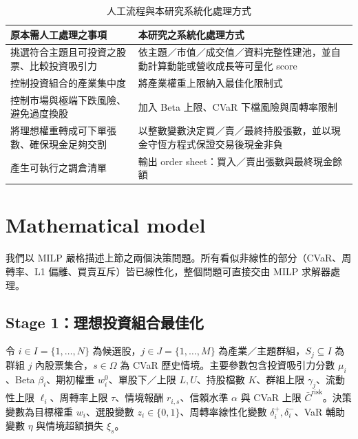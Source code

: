 \documentclass[11pt,a4paper]{article}
\begin{document}
\begin{table}[!hbt]
\centering
\small
\begin{tabular}{p{} p{}}
\toprule
原本需人工處理之事項 & 本研究之系統化處理方式 \\
\midrule
挑選符合主題且可投資之股票、比較投資吸引力 & 依主題／市值／成交值／資料完整性建池，並自動計算動能或營收成長等可量化 score \\
控制投資組合的產業集中度 & 將產業權重上限納入最佳化限制式 \\
控制市場與極端下跌風險、避免過度換股 & 加入 Beta 上限、CVaR 下檔風險與周轉率限制 \\
將理想權重轉成可下單張數、確保現金足夠交割 & 以整數變數決定買／賣／最終持股張數，並以現金守恆方程式保證交易後現金非負 \\
產生可執行之調倉清單 & 輸出 order sheet：買入／賣出張數與最終現金餘額 \\
\bottomrule
\end{tabular}
\caption{人工流程與本研究系統化處理方式}
\label{tab:auto}
\end{table}



\section{Mathematical model}
\label{sec-model}

我們以 MILP 嚴格描述上節之兩個決策問題。所有看似非線性的部分（CVaR、周轉率、L1 偏離、買賣互斥）皆已線性化，整個問題可直接交由 MILP 求解器處理。

\subsection{Stage 1：理想投資組合最佳化}

令 $i \in I = \{1, \dots, N\}$ 為候選股，$j \in J = \{1, \dots, M\}$ 為產業／主題群組，$S_j \subseteq I$ 為群組 $j$ 內股票集合，$s \in \Omega$ 為 CVaR 歷史情境。主要參數包含投資吸引力分數 $\mu_i$、Beta $\beta_i$、期初權重 $w_i^0$、單股下／上限 $L, U$、持股檔數 $K$、群組上限 $\gamma_j$、流動性上限 $\ell_i$、周轉率上限 $\tau$、情境報酬 $r_{i,s}$、信賴水準 $\alpha$ 與 CVaR 上限 $\bar{C}^{\text{risk}}$。決策變數為目標權重 $w_i$、選股變數 $z_i \in \{0,1\}$、周轉率線性化變數 $\delta_i^+, \delta_i^-$、VaR 輔助變數 $\eta$ 與情境超額損失 $\xi_s$。
\end{document}
